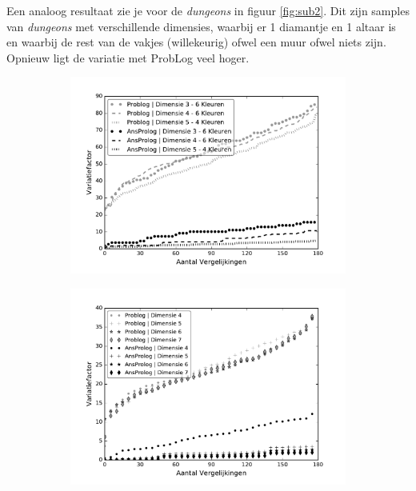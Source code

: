 \documentclass{article}
\begin{document}
	Een analoog resultaat zie je voor de \textit{dungeons} in figuur \ref{fig:sub2}. Dit zijn samples van \textit{dungeons} met verschillende dimensies, waarbij er 1 diamantje en 1 altaar is  en waarbij de rest van de vakjes (willekeurig) ofwel een muur ofwel niets zijn. Opnieuw ligt de variatie met ProbLog veel hoger.
	
	\begin{figure}[t]
\centering
\begin{subfigure}{.33\textwidth}
  \centering
  \includegraphics[width=\linewidth]{Grafieken/Variatie/Chromatic Maze/chm.pdf}
  \caption{}
  \label{fig:sub1}
\end{subfigure}%
\begin{subfigure}{.33\textwidth}
  \centering
  \includegraphics[width=\linewidth]{Grafieken/Variatie/Dungeon/dungeon.pdf}

\end{subfigure}
\end{figure}
\end{document}
